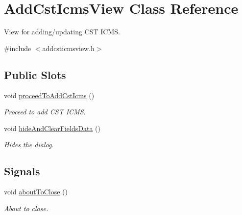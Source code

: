 \hypertarget{class_add_cst_icms_view}{\section{\-Add\-Cst\-Icms\-View \-Class \-Reference}
\label{class_add_cst_icms_view}
}


\-View for adding/updating \-C\-S\-T \-I\-C\-M\-S.  




{\ttfamily \#include $<$addcsticmsview.\-h$>$}

\subsection*{\-Public \-Slots}
\begin{DoxyCompactItemize}
\item 
void \hyperlink{class_add_cst_icms_view_ac6c522114e01c00a9ed29cd5f8110a63}{proceed\-To\-Add\-Cst\-Icms} ()
\begin{DoxyCompactList}\small\item\em \-Proceed to add \-C\-S\-T \-I\-C\-M\-S. \end{DoxyCompactList}\item 
void \hyperlink{class_add_cst_icms_view_ab7baf6d43b478565608e89a361649a35}{hide\-And\-Clear\-Fields\-Data} ()
\begin{DoxyCompactList}\small\item\em \-Hides the dialog. \end{DoxyCompactList}\end{DoxyCompactItemize}
\subsection*{\-Signals}
\begin{DoxyCompactItemize}
\item 
void \hyperlink{class_add_cst_icms_view_a35d01ae50d7dc57139e689f6c9bbd11e}{about\-To\-Close} ()
\begin{DoxyCompactList}\small\item\em \-About to close. \end{DoxyCompactList}\end{DoxyCompactItemize}
